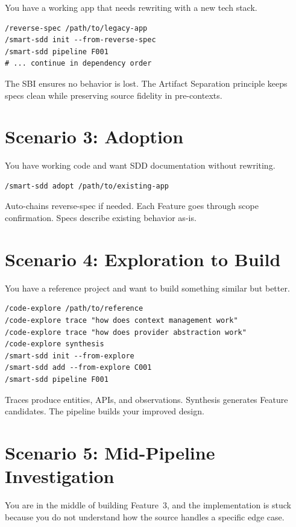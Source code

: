 \documentclass[11pt,a4paper,openright,twoside]{report}
\begin{document}
You have a working app that needs rewriting with a new tech stack.

\begin{lstlisting}
/reverse-spec /path/to/legacy-app
/smart-sdd init --from-reverse-spec
/smart-sdd pipeline F001
# ... continue in dependency order
\end{lstlisting}

The SBI ensures no behavior is lost. The Artifact Separation principle keeps specs clean while preserving source fidelity in pre-contexts.

\section{Scenario 3: Adoption}

You have working code and want SDD documentation without rewriting.

\begin{lstlisting}
/smart-sdd adopt /path/to/existing-app
\end{lstlisting}

Auto-chains reverse-spec if needed. Each Feature goes through scope confirmation. Specs describe existing behavior as-is.

\section{Scenario 4: Exploration to Build}

You have a reference project and want to build something similar but better.

\begin{lstlisting}
/code-explore /path/to/reference
/code-explore trace "how does context management work"
/code-explore trace "how does provider abstraction work"
/code-explore synthesis
/smart-sdd init --from-explore
/smart-sdd add --from-explore C001
/smart-sdd pipeline F001
\end{lstlisting}

Traces produce entities, APIs, and observations. Synthesis generates Feature candidates. The pipeline builds your improved design.

\section{Scenario 5: Mid-Pipeline Investigation}

You are in the middle of building Feature~3, and the implementation is stuck because you do not understand how the source handles a specific edge case.
\end{document}
